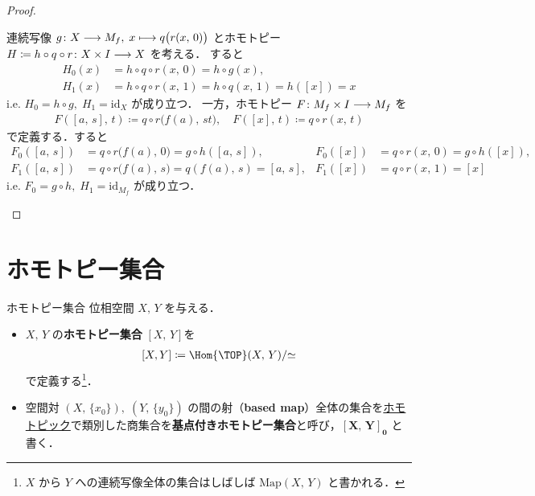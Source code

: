 \documentclass[algtopo_main]{subfiles}
\begin{document}
\begin{proof}
\begin{enumerate}
        連続写像 $g \colon X \longrightarrow M_f,\; x \longmapsto q \bigl( r(x,\, 0) \bigr) $ とホモトピー $H \coloneqq h \circ q \circ r \colon X \times I \longrightarrow X$ を考える．
        すると 
        \begin{align}
            H_0 (x) &= h \circ q \circ r(x,\, 0) = h \circ g (x), \\
            H_1(x) &= h \circ q \circ r(x,\, 1) = h \circ q(x,\, 1) = h([x]) = x
        \end{align}
        i.e. $H_0 = h \circ g,\; H_1 = \mathrm{id}_X$ が成り立つ．
        一方，ホモトピー $F \colon M_f \times I \longrightarrow M_f$ を
        \begin{align}
            F([a,\, s],\, t) \coloneqq q \circ r \bigl( f(a),\, st \bigr),\quad F([x],\, t) \coloneqq q \circ r (x,\, t)
        \end{align}
        で定義する．すると
        \begin{align}
            F_0([a,\, s]) &= q \circ r \bigl( f(a),\, 0 \bigr) = g \circ h([a,\, s]), & F_0([x]) &= q \circ r(x,\, 0) = g \circ h([x]), \\
            F_1([a,\, s]) &= q \circ r \bigl( f(a),\, s \bigr) = q(f(a),\, s) = [a,\, s], & F_1([x]) &= q \circ r(x,\, 1) = [x]
        \end{align}
        i.e. $F_0 = g \circ h,\; H_1 = \mathrm{id}_{M_f}$ が成り立つ．
    \end{enumerate}
    
\end{proof}

\section{ホモトピー集合}


\begin{mydef}[label=def:homotopy-set]{ホモトピー集合}
    位相空間 $X,\, Y$ を与える．
    \begin{itemize}
        \item $X,\, Y$ の\textbf{ホモトピー集合} $[X,\, Y]$を
        \begin{align}
            \comm{X}{Y} \coloneqq \Hom{\TOP}(X,\, Y)/ {\simeq}
        \end{align}
        で定義する\footnote{$X$ から $Y$ への連続写像全体の集合はしばしば $\mathrm{Map}(X,\, Y)$ と書かれる．}．
        \item 空間対 $(X,\, \{x_0\}),\; (Y,\, \{y_0\})$ の間の射（\textbf{based map}）全体の集合を\hyperref[def:homotopy-basic]{ホモトピック}で類別した商集合を\textbf{基点付きホモトピー集合}と呼び，$\bm{[X,\, Y]_0}$ と書く．
    \end{itemize}
\end{mydef}
\end{document}
